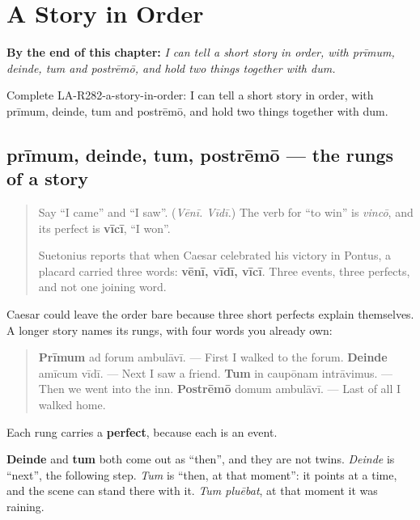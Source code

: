
\chapter{A Story in Order}
\label{ch:la-a-story-in-order}

\begin{chapteropening}
\textbf{By the end of this chapter:} \emph{I can tell a short story in order, with prīmum, deinde, tum and postrēmō, and hold two things together with dum.}

Complete LA-R282-a-story-in-order: I can tell a short story in order, with prīmum, deinde, tum and postrēmō, and hold two things together with dum.
\end{chapteropening}

\section[prīmum, deinde, tum, postrēmō]{prīmum, deinde, tum, postrēmō — the rungs of a story}

\label{lesson:LA-C282-primum-deinde}



\begin{quote}
Say \textquotedblleft{}I came\textquotedblright{} and \textquotedblleft{}I saw\textquotedblright{}. (\emph{Vēnī. Vīdī.}) The verb for \textquotedblleft{}to win\textquotedblright{} is \emph{vincō}, and its perfect is \textbf{vīcī}, \textquotedblleft{}I won\textquotedblright{}.

Suetonius reports that when Caesar celebrated his victory in Pontus, a placard carried three words: \textbf{vēnī, vīdī, vīcī}. Three events, three perfects, and not one joining word.
\end{quote}

\begin{grammarlens}[title={Grammar Lens: four rungs}]
Caesar could leave the order bare because three short perfects explain themselves. A longer story names its rungs, with four words you already own:

\begin{quote}
\textbf{Prīmum} ad forum ambulāvī. — First I walked to the forum. \textbf{Deinde} amīcum vīdī. — Next I saw a friend. \textbf{Tum} in caupōnam intrāvimus. — Then we went into the inn. \textbf{Postrēmō} domum ambulāvī. — Last of all I walked home.
\end{quote}

Each rung carries a \textbf{perfect}, because each is an event.

\textbf{Deinde} and \textbf{tum} both come out as \textquotedblleft{}then\textquotedblright{}, and they are not twins. \emph{Deinde} is \textquotedblleft{}next\textquotedblright{}, the following step. \emph{Tum} is \textquotedblleft{}then, at that moment\textquotedblright{}: it points at a time, and the scene can stand there with it. \emph{Tum pluēbat}, at that moment it was raining.
\end{grammarlens}

